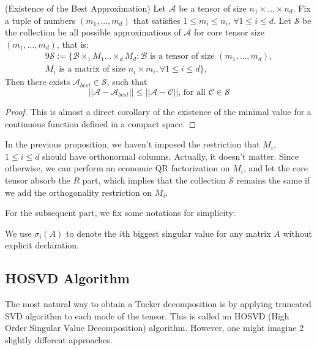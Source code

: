 \documentclass[12pt]{article}
\begin{document}
\begin{myprop}{(Existence of the Best Approximation)}
Let $\mathcal{A}$ be a tensor of size $n_1 \times \dots \times n_d$. Fix a tuple of numbers $(m_1, \dots, m_d)$ that satisfies $1 \leq m_i \leq n_i$, $\forall 1 \leq i \leq d$. Let $\mathscr{S}$ be the collection be all possible approximations of $\mathcal{A}$ for core tensor size  $(m_1, \dots, m_d)$, that is:
\begin{alignat*}{9}
\mathscr{S} := \{ \mathcal{B} \times_1 M_1 \dots \times_d  M_d: \mathcal{B} \text{ is a tensor of size } (m_1, \dots, m_d),  \\
M_i \text{ is a matrix of size } n_i \times m_i, \forall 1 \leq i \leq d \},
\end{alignat*}
Then there exists $\mathcal{A}_{best} \in \mathscr{S}$, such that
$$ || \mathcal{A} - \mathcal{A}_{best} || \leq || \mathcal{A} - \mathcal{C} || \text{, for all } \mathcal{C} \in \mathscr{S} $$
\end{myprop}

\begin{proof}
This is almost a direct corollary of the existence of the minimal value for a continuous function defined in a compact space.
\end{proof}

\begin{myrmk}
In the previous proposition, we haven't imposed the restriction that $M_i$, $1 \leq i \leq d$ should have orthonormal columns. Actually, it doesn't matter. Since otherwise, we can perform an economic QR factorization on $M_i$, and let the core tensor absorb the $R$ part, which implies that the collection $\mathscr{S}$ remains the same if we add the orthogonality restriction on $M_i$.

\end{myrmk}


For the subsequent part, we fix some notations for simplicity:
\begin{mynot}
We use $\sigma_i(A)$ to denote the $i$th biggest singular value for any matrix $A$ without explicit declaration.
\end{mynot}

\subsection{HOSVD Algorithm}

The most natural way to obtain a Tucker decomposition is by applying truncated SVD algorithm to each mode of the tensor. This is called an HOSVD (High Order Singular Value Decomposition) algorithm. However, one might imagine 2 slightly different approaches.
\end{document}
